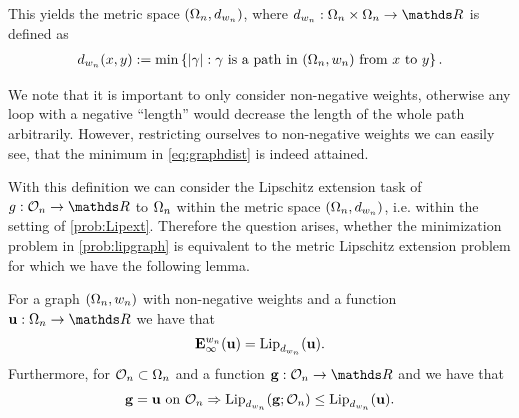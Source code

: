 %
This yields the metric space $(\Omega_n, d_{w_n})$, where $d_{w_n}:\domain_n\times\domain_n\to\R$ is defined as
%
\begin{align}\label{eq:graphdist}
d_{w_n}(x,y) := \min \left\{ \left|\gamma\right|: \gamma \text{ is a path in } 
(\Omega_n, w_n)\text{ from } x \text{ to } y\right\}.
\end{align}
%
\begin{remark}{}{}
We note that it is important to only consider non-negative weights, otherwise any loop with a negative \enquote{length} would decrease the 
length of the whole path arbitrarily. However, restricting ourselves to non-negative weights we can easily see, that the minimum in \cref{eq:graphdist} is indeed attained.
\end{remark}
%
\noindent%
With this definition we can consider the Lipschitz extension task of $g:\conset_n\to\R$ to $\Omega_n$ within the metric space $(\Omega_n,d_{w_n})$, i.e. within the setting of \cref{prob:Lipext}. Therefore the question arises, whether the minimization problem in \cref{prob:lipgraph} is equivalent to the metric Lipschitz extension problem for which we have the following lemma.
%
%
\begin{lemma}{}{}
For a graph $(\Omega_n, w_n)$ with non-negative weights and a function $\vec u:\domain_n\to\R$ we have that 
\begin{align*}
\mathbf{E}_\infty^{w_n}(\mathbf{u}) = \operatorname{Lip}_{d_{w_n}}(\mathbf{u}).
\end{align*}
%
Furthermore, for $\mathcal{O}_n\subset\Omega_n$ and a function $\vec g:\conset_n\to\R$ and we have that
%
\begin{align*}
\mathbf{g} = \mathbf{u} \text{ on } \mathcal{O}_n\Rightarrow
\operatorname{Lip}_{d_{w_n}}(\mathbf{g};\mathcal{O}_n) \leq \operatorname{Lip}_{d_{w_n}}(\mathbf{u}).
\end{align*}
\end{lemma}
%
%

